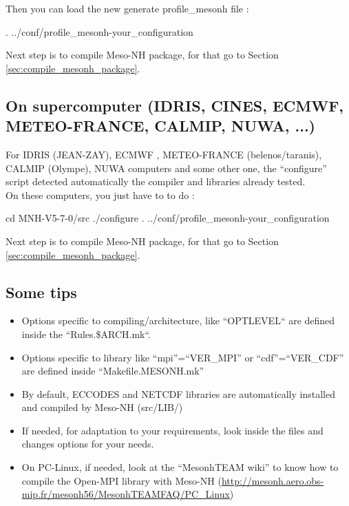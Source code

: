 Then you can load the new generate profile\_mesonh file :
\begin{bashcode}
. ../conf/profile_mesonh-your_configuration
\end{bashcode}

Next step is to compile Meso-NH package, for that go to Section \ref{sec:compile_mesonh_package}.

\subsection{On supercomputer (IDRIS, CINES, ECMWF, METEO-FRANCE, CALMIP, NUWA, ...)}

For IDRIS (JEAN-ZAY), ECMWF , METEO-FRANCE (belenos/taranis), CALMIP (Olympe), NUWA computers and some other one, the ``configure'' script detected automatically the compiler and libraries already tested. \\

On these computers, you just have to to do :
\begin{bashcode}
 cd MNH-V5-7-0/src
 ./configure
 . ../conf/profile_mesonh-your_configuration
 \end{bashcode}

Next step is to compile Meso-NH package, for that go to Section \ref{sec:compile_mesonh_package}.
 
\subsection{Some tips}

\begin{itemize}
\item Options specific to compiling/architecture, like ``OPTLEVEL`` are defined inside the ``Rules.\${ARCH}.mk``.
\item Options specific to library like ``mpi''=``VER\_MPI'' or ``cdf''=``VER\_CDF'' are defined inside ``Makefile.MESONH.mk''
\item By default, ECCODES and NETCDF libraries are automatically installed and compiled by Meso-NH (src/LIB/)
\item If needed, for adaptation to your requirements, look inside the files and changes options for your needs.
\item On PC-Linux, if needed, look at the ``MesonhTEAM wiki'' to know how to compile the Open-MPI library with Meso-NH (\href{http://mesonh.aero.obs-mip.fr/mesonh56/MesonhTEAMFAQ/PC_Linux}{http://mesonh.aero.obs-mip.fr/mesonh56/MesonhTEAMFAQ/PC\_Linux})
 \end{itemize}

 
